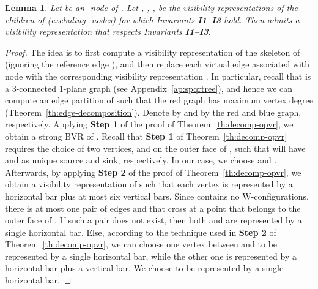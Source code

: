 \documentclass{article}
\newtheorem{lemma}{Lemma}
\begin{document}
\begin{lemma}\label{le:rnode}
Let  be an -node of . Let , , ,  be the  visibility representations of the  children of  (excluding -nodes) for which Invariants {\bf I1--I3} hold. Then  admits a visibility representation  that respects Invariants {\bf I1--I3}.
\end{lemma}
\begin{proof}
The idea is to first compute a visibility representation of the skeleton  of  (ignoring the reference edge ), and then replace each virtual edge  associated with node  with the corresponding visibility representation . In particular, recall that  is a 3-connected 1-plane graph (see Appendix~\ref{ap:spqrtree}), and hence we can compute an edge partition of  such that the red graph has maximum vertex degree  (Theorem~\ref{th:edge-decomposition}). Denote by  and by  the red and blue graph, respectively. Applying {\bf Step 1} of the proof of Theorem~\ref{th:decomp-opvr}, we obtain a strong BVR of .  Recall that {\bf Step 1} of Theorem~\ref{th:decomp-opvr} requires the choice of two vertices,  and  on the outer face of , such that  will have  and  as unique source and sink, respectively. In our case, we choose  and . Afterwards, by applying {\bf Step 2} of the proof of Theorem~\ref{th:decomp-opvr}, we obtain a visibility representation  of   such that each vertex is represented by a horizontal bar plus at most six vertical bars. Since  contains no W-configurations, there is at most one pair of edges   and  that cross at a point  that belongs to the outer face of . If such a pair does not exist, then both  and  are represented by a single horizontal bar. Else, according to the technique used in {\bf Step 2} of Theorem~\ref{th:decomp-opvr},  we can choose one vertex between  and  to be represented by a single horizontal bar, while the other one is represented by a horizontal bar plus a vertical bar. We choose  to be represented by a single horizontal bar.



\end{proof}
\end{document}
